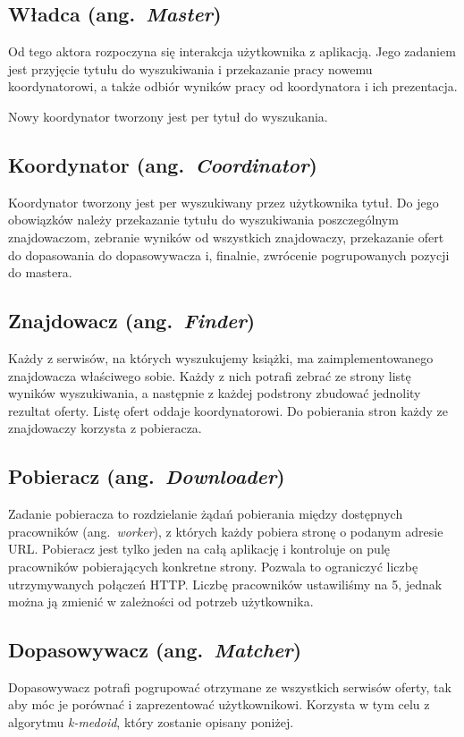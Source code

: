 \documentclass[a4paper,12pt]{mwart}
\newcommand{\ang}[1]{ang.~{\itshape #1}}
\begin{document}
\subsection{Władca (\ang{Master})}
Od tego aktora rozpoczyna się interakcja użytkownika z aplikacją. Jego zadaniem jest przyjęcie tytułu do wyszukiwania i przekazanie pracy nowemu koordynatorowi,
a także odbiór wyników pracy od koordynatora i ich prezentacja.

Nowy koordynator tworzony jest per tytuł do wyszukania.

\subsection{Koordynator (\ang{Coordinator})}
Koordynator tworzony jest per wyszukiwany przez użytkownika tytuł. Do jego obowiązków należy przekazanie tytułu do wyszukiwania poszczególnym znajdowaczom,
zebranie wyników od wszystkich znajdowaczy, przekazanie ofert do dopasowania do dopasowywacza i, finalnie, zwrócenie pogrupowanych pozycji do mastera.

\subsection{Znajdowacz (\ang{Finder})}
Każdy z serwisów, na których wyszukujemy książki, ma zaimplementowanego znajdowacza właściwego sobie. Każdy z nich potrafi zebrać ze strony listę wyników wyszukiwania,
a następnie z każdej podstrony zbudować jednolity rezultat oferty. Listę ofert oddaje koordynatorowi. Do pobierania stron każdy ze znajdowaczy korzysta z pobieracza.

\subsection{Pobieracz (\ang{Downloader})}
Zadanie pobieracza to rozdzielanie żądań pobierania między dostępnych pracowników (\ang{worker}), z których każdy pobiera stronę o podanym adresie URL.
Pobieracz jest tylko jeden na całą aplikację i kontroluje on pulę pracowników pobierających konkretne strony. Pozwala to ograniczyć liczbę utrzymywanych połączeń HTTP.
Liczbę pracowników ustawiliśmy na 5, jednak można ją zmienić w zależności od potrzeb użytkownika.

\subsection{Dopasowywacz (\ang{Matcher})}
Dopasowywacz potrafi pogrupować otrzymane ze wszystkich serwisów oferty, tak aby móc je porównać i zaprezentować użytkownikowi.
Korzysta w tym celu z algorytmu {\itshape k-medoid}, który zostanie opisany poniżej.
\end{document}

